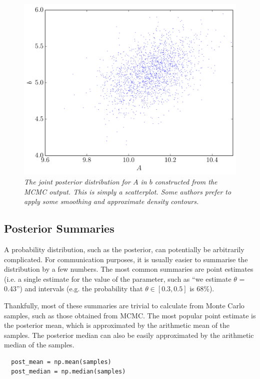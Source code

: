 \begin{figure}
\begin{center}
\includegraphics[scale=0.45]{joint_posterior.pdf}
\caption{\it The joint posterior distribution for $A$ in $b$ constructed from
the MCMC output. This is simply a scatterplot. Some authors prefer to
apply some smoothing and approximate density contours.
\label{fig:joint_posterior}}
\end{center}
\end{figure}


\subsection{Posterior Summaries}
A probability distribution, such as the posterior,
can potentially be arbitrarily complicated. For communication purposes, it is
usually easier to summarise the distribution by a few numbers. The most common
summaries are point estimates (i.e. a single estimate for the value of the
parameter, such as ``we estimate $\theta$ = 0.43'') and intervals (e.g.
the probability that $\theta \in [0.3, 0.5]$ is 68\%).

Thankfully, most of these summaries are trivial to calculate from Monte Carlo
samples, such as those obtained from MCMC. The most popular point estimate is
the posterior mean, which is approximated by the arithmetic mean of the samples.
The posterior median can also be easily approximated by the arithmetic median
of the samples.

\begin{verbatim}
  post_mean = np.mean(samples)
  post_median = np.median(samples)
\end{verbatim}

